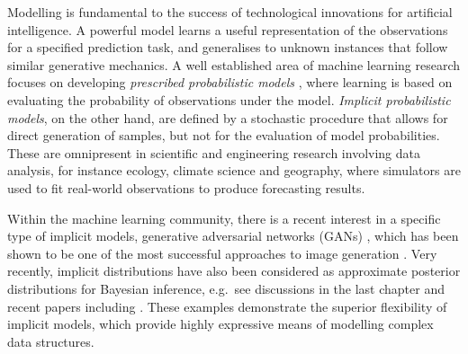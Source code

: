 
Modelling is fundamental to the success of technological innovations for artificial intelligence. A powerful model learns a useful representation of the observations for a specified prediction task, and generalises to unknown instances that follow similar generative mechanics. 
%
A well established area of machine learning research focuses on developing \emph{prescribed probabilistic models} \citep{diggle:prescribe_implicit1984}, where learning is based on evaluating the probability of observations under the model. \emph{Implicit probabilistic models}, on the other hand, are defined by a stochastic procedure that allows for direct generation of samples, but not for the evaluation of model probabilities. These are omnipresent in scientific and engineering research involving data analysis, for instance ecology, climate science and geography, where simulators are used to fit real-world observations to produce forecasting results. 

Within the machine learning community, there is a recent interest in a specific type of implicit models, generative adversarial networks (GANs) \citep{goodfellow:gan2014}, which has been shown to be one of the most successful approaches to image generation \citep{radford:dcgan2016, arjovsky:wgan2017, berthelot:began2017}. Very recently, implicit distributions have also been considered as approximate posterior distributions for Bayesian inference, e.g.~see discussions in the last chapter and recent papers including \citet{liu:two_wild2016, wang:amortisedsvgd2016, karaletsos:adversarial_mp2016, mescheder:avb2017, huszar:implicit2017, li:amcmc2017, tran:implicit2017, shi:kivi2018}. These examples demonstrate the superior flexibility of implicit models, which provide highly expressive means of modelling complex data structures.


